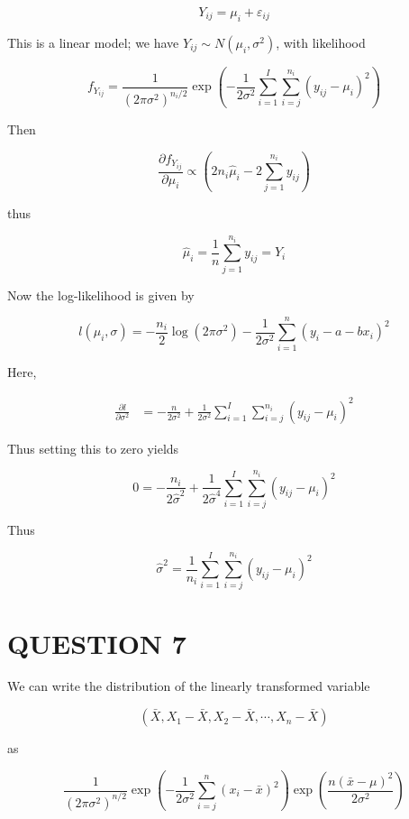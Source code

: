 \documentclass[a4paper]{article}
\begin{document}
\[ Y_{ij} = \mu_{i} + \varepsilon_{ij} \]

This is a linear model; we have $ Y_{ij} \sim N(\mu_{i}, \sigma^{2}) $, with likelihood

\[ f_{Y_{ij}} = \frac{1}{(2 \pi \sigma^{2})^{n_{i} /2}}  \exp \left(  - \frac{1}{2 \sigma^{2}} \sum_{i=1}^{I} \sum_{i=j}^{n_{i}} ( y_{ij} - \mu_{i} )^{2} \right)  \]

Then

\[ \frac{\partial f_{Y_{ij}} }{\partial \mu_{i}} \propto \left(  2n_{i} \hat{\mu}_{i} - 2 \sum_{j=1}^{n_{i}} y_{ij}  \right)   \]

thus 

\[ \hat{\mu}_{i} = \frac{1}{n} \sum_{j=1}^{n_{i}} y_{ij} = \hat{Y}_{i}  \]


Now the log-likelihood is given by

\[ l(\mu_{i}, \sigma) = - \frac{n_{i}}{2} \log(2 \pi \sigma^{2}) - \frac{1}{2 \sigma^{2}} \sum_{i=1}^{n} ( y_{i} - a - bx_{i})^{2}   \]

Here,

\begin{align*}
\frac{\partial l }{\partial \sigma^{2}} & = - \frac{n}{2 \sigma^{2}} + \frac{1}{2 \sigma^{2}} \sum_{i=1}^{I} \sum_{i=j}^{n_{i}} ( y_{ij} - \mu_{i} )^{2}
\end{align*}

Thus setting this to zero yields

\[ 0 = - \frac{n_{i}}{2 \hat{\sigma}^{2}}  + \frac{1}{2 \hat{\sigma}^{4}}\sum_{i=1}^{I} \sum_{i=j}^{n_{i}} ( y_{ij} - \mu_{i} )^{2}   \]

Thus

\[ \hat{\sigma}^{2} = \frac{1}{n_{i}} \sum_{i=1}^{I} \sum_{i=j}^{n_{i}} ( y_{ij} - \mu_{i} )^{2} \]





\section{QUESTION 7}


We can write the distribution of the linearly transformed variable

\[ (\bar{X}, X_{1} - \bar{X}, X_{2} - \bar{X}, \cdots, X_{n} - \bar{X}  ) \]


as 


\[ \frac{1}{(2 \pi \sigma^{2})^{n /2}}  \exp \left(  - \frac{1}{2 \sigma^{2}} \sum_{i=j}^{n} ( x_{i} - \bar{x} )^{2} \right) \exp \left(   \frac{n( \bar{x} - \mu  )^{2}}{2 \sigma^{2}}  \right)  \]
\end{document}
